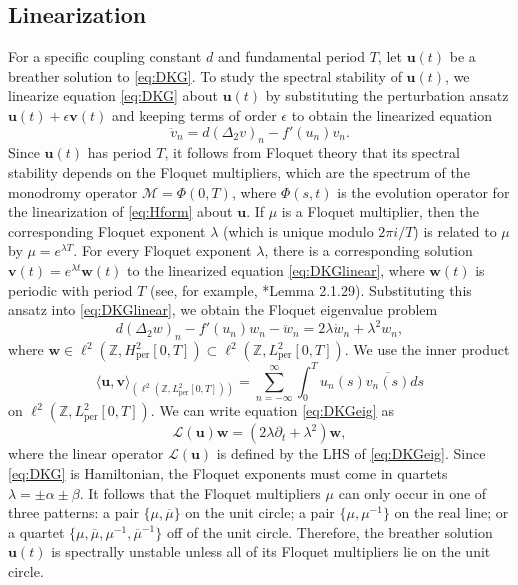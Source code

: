 \documentclass[12pt,reqno]{amsart}
\def\Z{{\mathbb Z}}
\def\per{\textrm{per}}
\def\calL{\mathcal{L}}
\def\calM{\mathcal{M}}
\newcommand{\uvec}{\mathbf{u}}
\newcommand{\vvec}{\mathbf{v}}
\newcommand{\wvec}{\mathbf{w}}
\theoremstyle{definition}
\begin{document}
\subsection{Linearization}\label{sec:DKGlinear}

For a specific coupling constant $d$ and fundamental period $T$, let $\uvec(t)$ be a breather solution to \cref{eq:DKG}. To study the spectral stability of $\uvec(t)$, we linearize equation \cref{eq:DKG} about $\uvec(t)$ by substituting the perturbation ansatz $\uvec(t) + \epsilon \vvec(t)$ and keeping terms of order $\epsilon$ to obtain the linearized equation
\begin{equation}\label{eq:DKGlinear}
\ddot{v}_n = d (\Delta_2 v)_n - f'(u_n)v_n.
\end{equation}
Since $\uvec(t)$ has period $T$, it follows from Floquet theory that its spectral stability depends on the Floquet multipliers, which are the spectrum of the monodromy operator $\calM = \Phi(0, T)$, where $\Phi(s, t)$ is the evolution operator for the linearization of \cref{eq:Hform} about $\uvec$. 
If $\mu$ is a Floquet multiplier, then the corresponding Floquet exponent $\lambda$ (which is unique modulo $2 \pi i/T$) is related to $\mu$ by $\mu = e^{\lambda T}$. 
For every Floquet exponent $\lambda$, there is a corresponding solution $\vvec(t) = e^{\lambda t} \wvec(t)$ to the linearized equation \cref{eq:DKGlinear}, where $\wvec(t)$ is periodic with period $T$ (see, for example, \cite{Kapitula2013}*{Lemma 2.1.29}). Substituting this ansatz into \cref{eq:DKGlinear}, we obtain the Floquet eigenvalue problem
\begin{equation}\label{eq:DKGeig}
d (\Delta_2 w)_n - f'(u_n)w_n - \ddot{w}_n = 2 \lambda \dot{w}_n + \lambda^2 w_n,
\end{equation}
where $\wvec \in \ell^2(\Z, H^2_\per[0,T]) \subset \ell^2(\Z, L^2_\per[0,T])$. We use the inner product
\begin{equation}\label{eq:IP1}
\langle \uvec, \vvec \rangle_{(\ell^2(\Z, L^2_\per[0,T]))} = \sum_{n=-\infty}^\infty \int_0^T u_n(s) \overline{v_n(s)} ds
\end{equation}
on $\ell^2(\Z, L^2_\per[0,T])$. We can write equation \cref{eq:DKGeig} as 
\begin{equation}\label{eq:DKGeigL}
\calL(\uvec)\wvec = (2 \lambda \partial_t + \lambda^2 )\wvec,
\end{equation}
where the linear operator $\calL(\uvec)$ is defined by the LHS of \cref{eq:DKGeig}. Since \cref{eq:DKG} is Hamiltonian, the Floquet exponents must come in quartets $\lambda = \pm \alpha \pm \beta$. It follows that the Floquet multipliers $\mu$ can only occur in one of three patterns: a pair $\{ \mu, \overline{\mu} \}$ on the unit circle; a pair $\{ \mu, \mu^{-1} \}$ on the real line; or a quartet $\{ \mu, \overline{\mu}, \mu^{-1}, \overline{\mu}^{-1} \}$ off of the unit circle. Therefore, the breather solution $\uvec(t)$ is spectrally unstable unless all of its Floquet multipliers lie on the unit circle.
\end{document}
